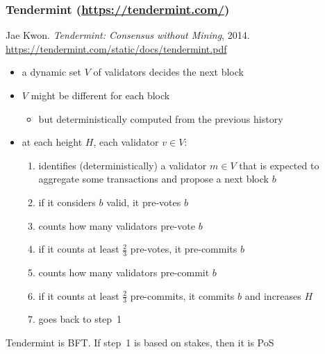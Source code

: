 \documentclass[11pt]{beamer}  %
\begin{document}
\begin{frame}\frametitle{Tendermint (\url{https://tendermint.com/})}

  \begin{greenbox}{Jae Kwon. \emph{Tendermint: Consensus without Mining}, 2014.\\
    \url{https://tendermint.com/static/docs/tendermint.pdf}}
    \begin{itemize}
    \item a dynamic set $V$ of validators decides the next block
    \item $V$ might be different for each block
      \begin{itemize}
      \item but deterministically computed from the previous history
      \end{itemize}
    \item at each height $H$, each validator $v\in V$:
      \begin{enumerate}
      \item identifies (deterministically) a validator $m\in V$ that
        is expected to aggregate some transactions and \alert{propose} a next block $b$
      \item if it considers $b$ valid, it \alert{pre-votes} $b$
      \item counts how many validators pre-vote $b$
      \item if it counts at least $\frac{2}{3}$ pre-votes, it \alert{pre-commits} $b$
      \item counts how many validators pre-commit $b$
      \item if it counts at least $\frac{2}{3}$ pre-commits, it \alert{commits} $b$ and increases $H$
      \item goes back to step~1
      \end{enumerate}
    \end{itemize}
  \end{greenbox}

  \smallskip

  \begin{center}
    Tendermint is BFT. If step~1 is based on stakes, then it is PoS
  \end{center}

\end{frame}
\end{document}
